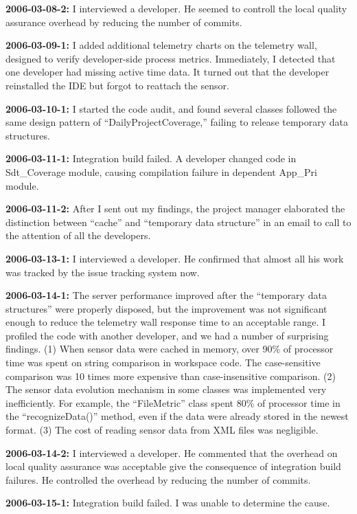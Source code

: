 \textbf{2006-03-08-2:}
I interviewed a developer. He seemed to controll the local quality assurance overhead by reducing the number of commits.

\textbf{2006-03-09-1:}
I added additional telemetry charts on the telemetry wall, designed to verify developer-side process metrics. Immediately, I detected that one developer had missing active time data. It turned out that the developer reinstalled the IDE but forgot to reattach the sensor.

\textbf{2006-03-10-1:}
I started the code audit, and found several classes followed the same design pattern of ``DailyProjectCoverage,'' failing to release temporary data structures.

\textbf{2006-03-11-1:}
Integration build failed. A developer changed code in Sdt\_Coverage module, causing compilation failure in dependent App\_Pri module. 

\textbf{2006-03-11-2:}
After I sent out my findings, the project manager elaborated the distinction between ``cache'' and ``temporary data structure'' in an email to call to the attention of all the developers.

\textbf{2006-03-13-1:}
I interviewed a developer. He confirmed that almost all his work was tracked by the issue tracking system now.  

\textbf{2006-03-14-1:}
The server performance improved after the ``temporary data structures'' were properly disposed, but the improvement was not significant enough to reduce the telemetry wall response time to an acceptable range. I profiled the code with another developer, and we had a number of surprising findings. (1) When sensor data were cached in memory, over 90\% of processor time was spent on string comparison in workspace code. The case-sensitive comparison was 10 times more expensive than case-insensitive comparison. (2) The sensor data evolution mechanism in some classes was implemented very inefficiently. For example, the ``FileMetric'' class spent 80\% of processor time in the ``recognizeData()'' method, even if the data were already stored in the newest format. (3) The cost of reading sensor data from XML files was negligible.

\textbf{2006-03-14-2:}
I interviewed a developer. He commented that the overhead on local quality assurance was acceptable give the consequence of integration build failures. He controlled the overhead by reducing the number of commits.

\textbf{2006-03-15-1:}
Integration build failed. I was unable to determine the cause.

